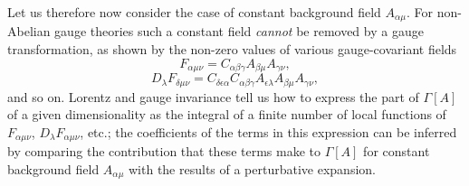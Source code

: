 Let us therefore now consider the case of constant background field
$A_{\alpha\mu}$. For non-Abelian gauge theories such a constant field
\emph{cannot} be removed by a gauge transformation, as shown by the non-zero
values of various gauge-covariant fields
\begin{equation}
F_{\alpha\mu\nu}=C_{\alpha\beta\gamma}A_{\beta\mu}A_{\gamma\nu},
\label{eq:17.5.11}
\end{equation}
\begin{equation}
D_\lambda F_{\delta\mu\nu}
=C_{\delta\epsilon\alpha}C_{\alpha\beta\gamma}
A_{\epsilon\lambda}A_{\beta\mu}A_{\gamma\nu},
\label{eq:17.5.12}
\end{equation}
and so on. Lorentz and gauge invariance tell us how to express the part
of $\Gamma[A]$ of a given dimensionality as the integral of a finite number
of local functions of $F_{\alpha\mu\nu}$, $D_\lambda F_{\alpha\mu\nu}$, etc.;
the coefficients of the terms in this expression can be inferred by comparing
the contribution that these terms make to $\Gamma[A]$ for constant background
field $A_{\alpha\mu}$ with the results of a perturbative expansion.

